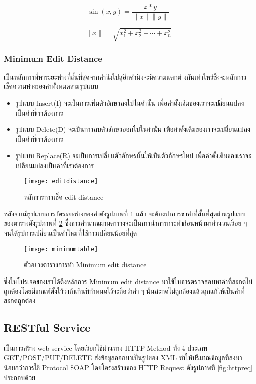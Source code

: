 \begin{equation}
    \sin(x,y)=\frac{x*y}{\|x\|\|y\|}
\end{equation}    

\begin{equation}
    \|x\|=\sqrt{x_{1}^2+x_{2}^2+\cdots+x_{n}^2}
\end{equation}    
\subsubsection{Minimum Edit Distance}

เป็นหลักการที่หาระยะห่างที่สั้นที่สุดจากคำนึงไปสู่อีกคำนึงจะมีความแตกต่างกันเท่าไหร่ซึ่งจะหลักการเช็คความห่างของคำทั้งหมดสามรูปแบบ
\begin{itemize}
    \item รูปแบบ Insert(I) จะเป็นการเพิ่มตัวอักษรลงไปในคำนั้น เพื่อคำดั้งเดิมของเราจะเปลี่ยนแปลงเป็นคำที่เราต้องการ
    \item รูปแบบ Delete(D) จะเป็นการลบตัวอักษรออกไปในคำนั้น เพื่อคำดั้งเดิมของเราจะเปลี่ยนแปลงเป็นคำที่เราต้องการ
    \item รูปแบบ Replace(R) จะเป็นการเปลี่ยนตัวอักษรนั้นให้เป็นตัวอักษรใหม่ เพื่อคำดั้งเดิมของเราจะเปลี่ยนแปลงเป็นคำที่เราต้องการ
\end{itemize}
\begin{figure}[H]
    \centering
    \texttt{[image: editdistance]}
    \caption{หลักการการเช็ค edit distance \cite{ritambhara}}\label{fig:editdistance}
\end{figure}
หลังจากมีรูปแบบการวัดระยะห่างของคำดังรูปภาพที่ \ref{fig:editdistance} แล้ว จะต้องทำการหาคำที่สั้นที่สุดผ่านรูปแบบของตารางดังรูปภาพที่ \ref{fig:minimumtable} ซึ่งการคำนวณผ่านตารางจะเป็นการนำการกระทำก่อนหน้ามาคำนวนเรื่อย ๆ จนได้รูปการเปลี่ยนเป็นคำใหม่ที่ใช้การเปลี่ยนน้อยที่สุด
\begin{figure}[H]
    \centering
    \texttt{[image: minimumtable]}
    \caption{ตัวอย่างตารางการทำ Minimum edit distance \cite{ritambhara}}\label{fig:minimumtable}
\end{figure}

ซึ่งในโปรเจคของเราได้ดึงหลักการ Minimum edit distance มาใช้ในการตรวจสอบหาคำที่สะกดไม่ถูกต้องโดยมีเกณฑ์ตั้งไว้ว่าถ้าเกินที่กำหนดไว้จะถือว่าคำ ๆ นั้นสะกดไม่ถูกต้องแล้วถูกแก้ให้เป็นคำที่สะกดถูกต้อง

\subsection{RESTful Service}
เป็นการสร้าง web service โดยเรียกใช้ผ่านทาง HTTP Method ทั้ง 4 ประเภท GET/POST/PUT/DELETE ส่งข้อมูลออกมาเป็นรูปของ XML ทำให้ปริมาณข้อมูลที่ส่งมาน้อยกว่าการใช้ Protocol SOAP  โดยโครงสร้างของ 
HTTP Request ดังรูปภาพที่ \ref{fig:httpreq} ประกอบด้วย 


